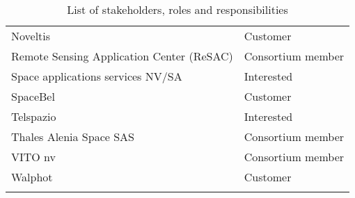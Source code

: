 \begin{small}
\begin{longtable}{p{9.5cm}l}
	Noveltis&Customer\\
	Remote Sensing Application Center (ReSAC)                               & Consortium member \\
	Space applications services NV/SA&Interested\\
	SpaceBel&Customer\\
	Telspazio&Interested\\
	Thales Alenia Space SAS             & Consortium member                                                                       \\ 
	VITO nv                             & Consortium member \\
	Walphot&Customer\\

	\bottomrule[2pt]

	\caption{List of stakeholders, roles and responsibilities}
	\label{table_stakeholders}

\end{longtable}
\end{small}
